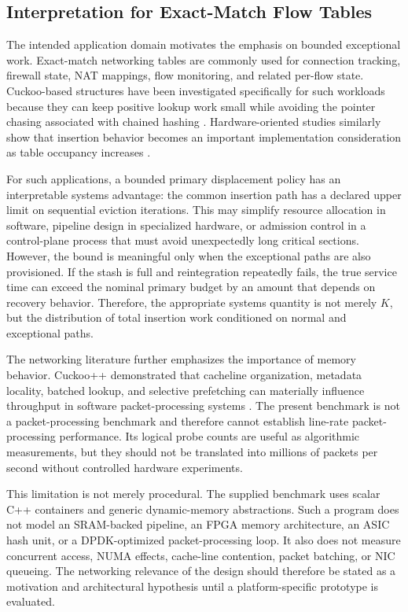 \documentclass[conference]{IEEEtran}
\begin{document}
\subsection{Interpretation for Exact-Match Flow Tables}
\label{subsec:discussion_flowtables}

The intended application domain motivates the emphasis on bounded exceptional
work. Exact-match networking tables are commonly used for connection
tracking, firewall state, NAT mappings, flow monitoring, and related per-flow
state. Cuckoo-based structures have been investigated specifically for such
workloads because they can keep positive lookup work small while avoiding the
pointer chasing associated with chained hashing \cite{lescouarnec2018cuckoopp,pontarelli2016cuckoocache}.
Hardware-oriented studies similarly show that insertion behavior becomes an
important implementation consideration as table occupancy increases
\cite{megias2025minimizing}.

For such applications, a bounded primary displacement policy has an
interpretable systems advantage: the common insertion path has a declared
upper limit on sequential eviction iterations. This may simplify resource
allocation in software, pipeline design in specialized hardware, or admission
control in a control-plane process that must avoid unexpectedly long critical
sections. However, the bound is meaningful only when the exceptional paths are
also provisioned. If the stash is full and reintegration repeatedly fails,
the true service time can exceed the nominal primary budget by an amount that
depends on recovery behavior. Therefore, the appropriate systems quantity is
not merely $K$, but the distribution of total insertion work conditioned on
normal and exceptional paths.

The networking literature further emphasizes the importance of memory
behavior. Cuckoo++ demonstrated that cacheline organization, metadata locality,
batched lookup, and selective prefetching can materially influence throughput
in software packet-processing systems \cite{lescouarnec2018cuckoopp}. The
present benchmark is not a packet-processing benchmark and therefore cannot
establish line-rate packet-processing performance. Its logical probe counts
are useful as algorithmic measurements, but they should not be translated
into millions of packets per second without controlled hardware experiments.

This limitation is not merely procedural. The supplied benchmark uses scalar
C++ containers and generic dynamic-memory abstractions. Such a program does
not model an SRAM-backed pipeline, an FPGA memory architecture, an ASIC hash
unit, or a DPDK-optimized packet-processing loop. It also does not measure
concurrent access, NUMA effects, cache-line contention, packet batching, or NIC
queueing. The networking relevance of the design should therefore be stated
as a motivation and architectural hypothesis until a platform-specific
prototype is evaluated.
\end{document}
